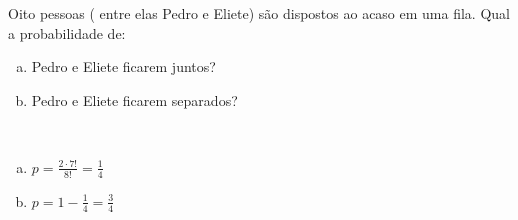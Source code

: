 \begin{ex}
 	Oito pessoas ( entre elas Pedro e Eliete) são dispostos ao acaso em uma fila. Qual a probabilidade de:
    \begin{enumerate}[(a)]
    \item Pedro e Eliete ficarem juntos?
    \item Pedro e Eliete ficarem separados?
    \end{enumerate}
      \begin{sol}
        \phantom{A}\\
          \begin{enumerate} [(a)]
              \item $p=\frac{2\cdot7!}{8!}=\frac{1}{4}$
              \item
              $p=1-\frac{1}{4}=\frac{3}{4}$
          \end{enumerate}
      \end{sol}
\end{ex}